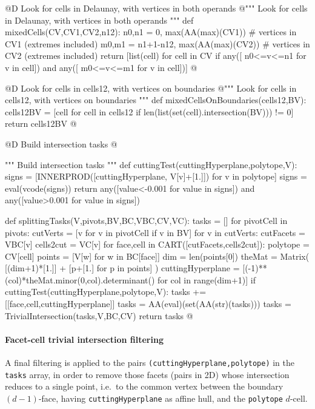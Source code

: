 \documentclass[11pt,oneside]{article}	%
\begin{document}
@D Look for cells in Delaunay, with vertices in both operands
@{""" Look for cells in Delaunay, with vertices in both operands """
def mixedCells(CV,CV1,CV2,n12):
	n0,n1 = 0, max(AA(max)(CV1))			# vertices in CV1 (extremes included)
	m0,m1 = n1+1-n12, max(AA(max)(CV2))		# vertices in CV2 (extremes included)
	return [list(cell) for cell in CV if any([ n0<=v<=n1 for v in cell]) 
		and any([ m0<=v<=m1 for v in cell])]
@}

@D Look for cells in cells12, with vertices on boundaries
@{""" Look for cells in cells12, with vertices on boundaries """
def mixedCellsOnBoundaries(cells12,BV):
	cells12BV = [cell for cell in cells12
					if len(list(set(cell).intersection(BV))) != 0]
	return cells12BV
@}

@D Build intersection tasks
@{""" Build intersection tasks """
def cuttingTest(cuttingHyperplane,polytope,V):
	signs = [INNERPROD([cuttingHyperplane, V[v]+[1.]]) for v in polytope]
	signs = eval(vcode(signs))
	return any([value<-0.001 for value in signs]) and any([value>0.001 for value in signs])

def splittingTasks(V,pivots,BV,BC,VBC,CV,VC):
	tasks = []
	for pivotCell in pivots:
		cutVerts = [v for v in pivotCell if v in BV]
		for v in cutVerts:
			cutFacets = VBC[v]
			cells2cut = VC[v]
			for face,cell in CART([cutFacets,cells2cut]):
				polytope = CV[cell]
				points = [V[w] for w in BC[face]]
				dim = len(points[0])
				theMat = Matrix( [(dim+1)*[1.]] + [p+[1.] for p in points] )
				cuttingHyperplane = [(-1)**(col)*theMat.minor(0,col).determinant() 
									for col in range(dim+1)]
				if cuttingTest(cuttingHyperplane,polytope,V):
					tasks += [[face,cell,cuttingHyperplane]]
	tasks = AA(eval)(set(AA(str)(tasks)))
	tasks = TrivialIntersection(tasks,V,BC,CV)
	return tasks
@}

\paragraph{Facet-cell trivial intersection filtering}

A final filtering is applied to the pairs \texttt{(cutting\-Hyper\-plane,polytope)} in the \texttt{tasks} array, in order to remove those facets (pairs in 2D) whose intersection reduces to a single point, i.e.~to the common vertex between the boundary $(d-1)$-face, having \texttt{cuttingHyperplane} as affine hull, and the \texttt{polytope} $d$-cell.
\end{document}
